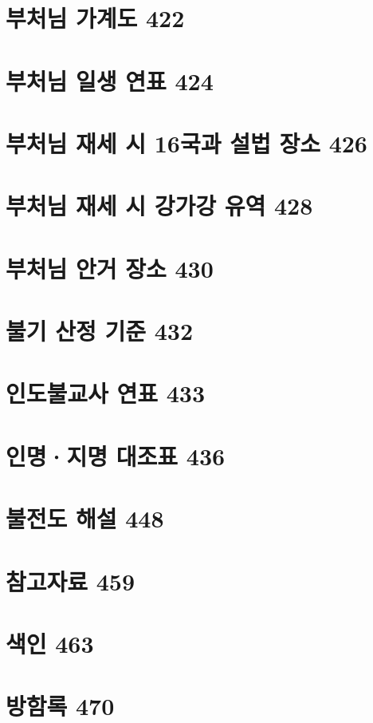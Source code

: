 \documentclass[12pt, a4paper, oneside]{book}
\let\stdsection\section
\renewcommand\section{\newpage\stdsection}
\begin{document}
	\section{부처님 가계도 422}


	\section{부처님 일생 연표 424 }

	\section{부처님 재세 시 16국과 설법 장소 426}


	\section{부처님 재세 시 강가강 유역 428 }

	\section{부처님 안거 장소 430 }

	\section{불기 산정 기준 432 }

	\section{인도불교사 연표 433 }

	\section{인명·지명 대조표 436 }

	\section{불전도 해설 448 }

	\section{참고자료 459}

	\section{색인 463 }

	\section{방함록 470}


\end{document}
